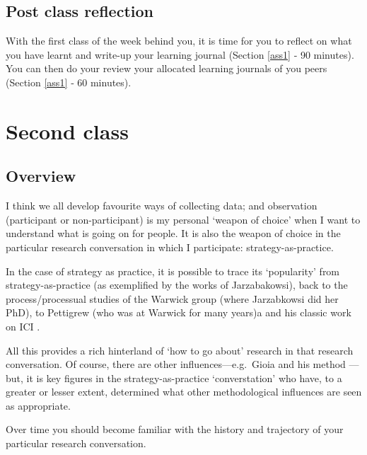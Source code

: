 \documentclass[]{book}
\theoremstyle{definition}
\theoremstyle{definition}
\theoremstyle{definition}
\theoremstyle{remark}
\begin{document}
\hypertarget{post-class-reflection-2}{%
\subsection{Post class reflection}\label{post-class-reflection-2}}

With the first class of the week behind you, it is time for you to
reflect on what you have learnt and write-up your learning journal
(Section \ref{ass1} ‐ 90 minutes). You can then do your review your
allocated learning journals of you peers (Section \ref{ass1} ‐ 60
minutes).

\hypertarget{second-class-1}{%
\section*{Second class}\label{second-class-1}}

\hypertarget{overview-3}{%
\subsection*{Overview}\label{overview-3}}

I think we all develop favourite ways of collecting data; and
observation (participant or non-participant) is my personal `weapon of
choice' when I want to understand what is going on for people. It is
also the weapon of choice in the particular research conversation in
which I participate: strategy-as-practice.

In the case of strategy as practice, it is possible to trace its
`popularity' from strategy-as-practice (as exemplified by the works of
Jarzabakowsi), back to the process/processual studies of the Warwick
group (where Jarzabkowsi did her PhD), to Pettigrew (who was at Warwick
for many years)a and his classic work on ICI
\autocite{pettigrew_1985_awakinggiant}.

All this provides a rich hinterland of `how to go about' research in
that research conversation. Of course, there are other
influences---e.g.~Gioia and his method
\autocite{gioia_2013_seekingqualitativerigor}---but, it is key figures
in the strategy-as-practice `converstation' who have, to a greater or
lesser extent, determined what other methodological influences are seen
as appropriate.

Over time you should become familiar with the history and trajectory of
your particular research conversation.
\end{document}
